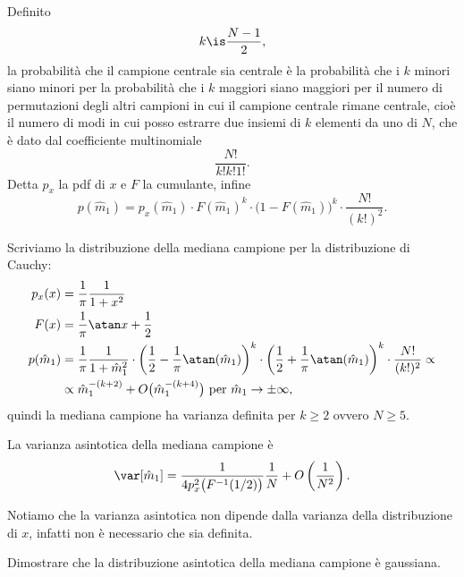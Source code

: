 Definito
\begin{equation*}
	k \is \frac{N-1}2,
\end{equation*}
la probabilità che il campione centrale sia centrale è
la probabilità che i $k$ minori siano minori
per la probabilità che i $k$ maggiori siano maggiori
per il numero di permutazioni degli altri campioni in cui il campione centrale rimane centrale,
cioè il numero di modi in cui posso estrarre due insiemi di $k$ elementi da uno di $N$,
che è dato dal coefficiente multinomiale
\begin{equation*}
	\frac{N!}{k!k!1!}.
\end{equation*}
Detta $p_x$ la pdf di $x$ e $F$ la cumulante, infine
\begin{equation*}
	p(\hat m_1)
	= p_x(\hat m_1)
	\cdot F(\hat m_1)^k
	\cdot \big(1-F(\hat m_1)\big)^k
	\cdot \frac{N!}{(k!)^2}.
\end{equation*}
\begin{example}
	Scriviamo la distribuzione della mediana campione per la distribuzione di Cauchy:
	\begin{align*}
		p_x(x)
		&= \frac1\pi \frac1{1+x^2} \\
		F(x)
		&= \frac1\pi\atan x + \frac12 \\
		p(\hat m_1)
		&= \frac 1\pi \frac1{1+\hat m_1^2}
		\cdot \left(\frac12 - \frac1\pi\atan(\hat m_1)\right)^k
		\cdot \left(\frac12 + \frac1\pi\atan(\hat m_1)\right)^k
		\cdot \frac{N!}{(k!)^2} \propto \\
		&\propto \hat m_1^{-(k+2)} + O\big(\hat m_1^{-(k+4)}\big) \text{ per $\hat m_1\to\pm\infty$},
	\end{align*}
	quindi la mediana campione ha varianza definita per $k\ge2$ ovvero $N\ge5$.
\end{example}

\begin{fact}
	La varianza asintotica della mediana campione è
	\begin{equation*}
		\var[\hat m_1]
		= \frac1{4p_x^2\big(F^{-1}(1/2)\big)}\frac1N + O\left(\frac1{N^2}\right).
	\end{equation*}
\end{fact}

\noindent Notiamo che la varianza asintotica non dipende dalla varianza della distribuzione di $x$,
infatti non è necessario che sia definita.

\begin{exercise}
	Dimostrare che la distribuzione asintotica della mediana campione è gaussiana.
\end{exercise}

